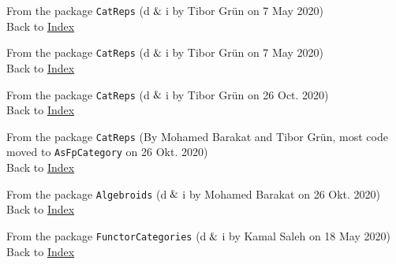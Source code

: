 
From the package \texttt{CatReps} (d$\And$i by Tibor Grün on 7 May 2020) \\
Back to \hyperref[lol]{Index}
		

From the package \texttt{CatReps} (d$\And$i by Tibor Grün on 7 May 2020) \\
Back to \hyperref[lol]{Index}
		

From the package \texttt{CatReps} (d$\And$i by Tibor Grün on 26 Oct. 2020) \\
Back to \hyperref[lol]{Index}


From the package \texttt{CatReps} (By Mohamed Barakat and Tibor Grün, most code moved to \texttt{AsFpCategory} on 26 Okt. 2020) \\
Back to \hyperref[lol]{Index}


From the package \texttt{Algebroids} (d$\And$i by Mohamed Barakat on 26 Okt. 2020) \\
Back to \hyperref[lol]{Index}
		

From the package \texttt{FunctorCategories} (d$\And$i by Kamal Saleh on 18 May 2020) \\
Back to \hyperref[lol]{Index}

